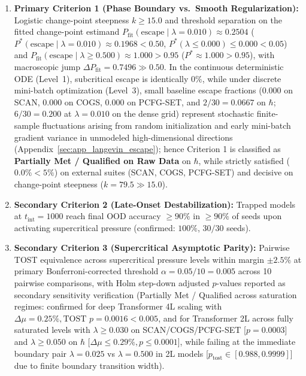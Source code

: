 \documentclass{article}
\theoremstyle{plain}
\theoremstyle{definition}
\begin{document}
\begin{enumerate}[leftmargin=*,noitemsep]
    \item \textbf{Primary Criterion 1 (Phase Boundary vs.\ Smooth Regularization):} Logistic change-point steepness $k \ge 15.0$ and threshold separation on the fitted change-point estimand $P_{\text{fit}}(\text{escape} \mid \lambda = 0.010) \approx 0.2504$ ($P^*(\text{escape} \mid \lambda = 0.010) \approx 0.1968 < 0.50$, $P^*(\lambda \le 0.000) \le 0.000 < 0.05$) and $P_{\text{fit}}(\text{escape} \mid \lambda \ge 0.500) \approx 1.000 > 0.95$ ($P^* \approx 1.000 > 0.95$), with macroscopic jump $\Delta P_{\text{fit}} = 0.7496 \gg 0.50$. In the continuous deterministic ODE (Level~1), subcritical escape is identically $0\%$, while under discrete mini-batch optimization (Level~3), small baseline escape fractions ($0.000$ on SCAN, $0.000$ on COGS, $0.000$ on PCFG-SET, and $2/30 = 0.0667$ on $\hbar$; $6/30 = 0.200$ at $\lambda = 0.010$ on the dense grid) represent stochastic finite-sample fluctuations arising from random initialization and early mini-batch gradient variance in unmodeled high-dimensional directions (Appendix~\ref{sec:app_langevin_escape}); hence Criterion 1 is classified as \textbf{Partially Met / Qualified on Raw Data} on $\hbar$, while strictly satisfied ($0.0\% < 5\%$) on external suites (SCAN, COGS, PCFG-SET) and decisive on change-point steepness ($k = 79.5 \gg 15.0$).
    \item \textbf{Secondary Criterion 2 (Late-Onset Destabilization):} Trapped models at $t_{\text{int}} = 1000$ reach final OOD accuracy $\ge 90\%$ in $\ge 90\%$ of seeds upon activating supercritical pressure (confirmed: $100\%$, $30/30$ seeds).
    \item \textbf{Secondary Criterion 3 (Supercritical Asymptotic Parity):} Pairwise TOST equivalence across supercritical pressure levels within margin $\pm 2.5\%$ at primary Bonferroni-corrected threshold $\alpha = 0.05 / 10 = 0.005$ across 10 pairwise comparisons, with Holm step-down adjusted $p$-values reported as secondary sensitivity verification (Partially Met / Qualified across saturation regimes: confirmed for deep Transformer 4L scaling with $\Delta\mu = 0.25\%, \text{TOST } p = 0.0016 < 0.005$, and for Transformer 2L across fully saturated levels with $\lambda \ge 0.030$ on SCAN/COGS/PCFG-SET [$p = 0.0003$] and $\lambda \ge 0.050$ on $\hbar$ [$\Delta\mu \le 0.29\%, p \le 0.0001$], while failing at the immediate boundary pair $\lambda=0.025$ vs $\lambda=0.500$ in 2L models [$p_{\text{tost}} \in [0.988, 0.9999]$] due to finite boundary transition width).

\end{enumerate}
\end{document}
